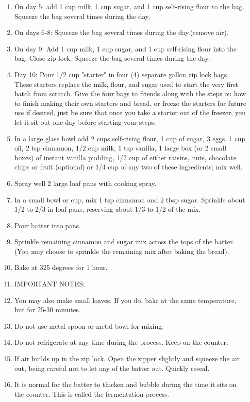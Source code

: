 \documentclass[11pt, twoside, openany]{book}
\begin{document}
\begin{minipage}[t]{\linewidth}
\begin{enumerate}
\item On day 5: add 1 cup milk, 1 cup sugar, and 1 cup self-rising flour to the bag. Squeeze the bag several times during the day.
\item On days 6-8: Squeeze the bag several times during the day.(remove air).
\item On day 9: Add 1 cup milk, 1 cup sugar, and 1 cup self-rising flour into the bag. Close zip lock. Squeeze the bag several times during the day.
\item Day 10: Pour 1/2 cup "starter" in four (4) separate gallon zip lock bags. These starters replace the milk, flour, and sugar used to start the very first batch from scratch. Give the four bags to friends along with the steps on how to finish making their own starters and bread, or freeze the starters for future use if desired, just be sure that once you take a starter out of the freezer, you let it sit out one day before starting your steps.
\item In a large glass bowl add 2 cups self-rising flour, 1 cup of sugar, 3 eggs, 1 cup oil, 2 tsp cinnamon, 1/2 cup milk, 1 tsp vanilla, 1 large box (or 2 small boxes) of instant vanilla pudding, 1/2 cup of either raisins, nuts, chocolate chips or fruit (optional) or 1/4 cup of any two of these ingredients; mix well.
\item Spray well 2 large loaf pans with cooking spray.
\item In a small bowl or cup, mix 1 tsp cinnamon and 2 tbsp sugar. Sprinkle about 1/2 to 2/3 in loaf pans, reserving about 1/3 to 1/2 of the mix.
\item Pour batter into pans.
\item Sprinkle remaining cinnamon and sugar mix across the tops of the batter.(You may choose to sprinkle the remaining mix after baking the bread).
\item Bake at 325 degrees for 1 hour.
\item IMPORTANT NOTES:
\item You may also make small loaves. If you do, bake at the same temperature, but for 25-30 minutes.
\item Do not use metal spoon or metal bowl for mixing.
\item Do not refrigerate at any time during the process. Keep on the counter.
\item If air builds up in the zip lock. Open the zipper slightly and squeeze the air out, being careful not to let any of the batter out. Quickly reseal.
\item It is normal for the batter to thicken and bubble during the time it sits on the counter. This is called the fermentation process.

\end{enumerate}
\end{minipage}
\end{document}
